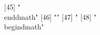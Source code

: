  [45] "\\end{dmath}"                                                                                                                                                                                                                                                                                                                                                                                                                                                                                                                                                                                                                                 
 [46] ""                                                                                                                                                                                                                                                                                                                                                                                                                                                                                                                                                                                                                                             
 [47] "%
 [48] "\\begin{dmath}"                                                                                                                                                                                                                                                                                                                                                                                                                                                                                                                                                                                                                               
